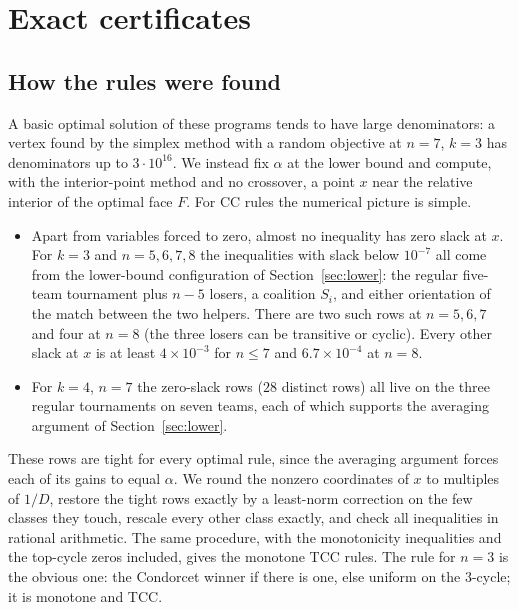 \documentclass[11pt]{amsart}
\theoremstyle{definition}
\theoremstyle{remark}
\begin{document}
\section{Exact certificates}\label{sec:cert}

\subsection*{How the rules were found}
A basic optimal solution of these programs tends to have large denominators: a vertex found by the simplex method with a random objective at $n=7$, $k=3$ has denominators up to $3\cdot10^{16}$. We instead fix $\alpha$ at the lower bound and compute, with the interior-point method and no crossover, a point $x$ near the relative interior of the optimal face $F$. For CC rules the numerical picture is simple.
\begin{itemize}
\item Apart from variables forced to zero, almost no inequality has zero slack at $x$. For $k=3$ and $n=5,6,7,8$ the inequalities with slack below $10^{-7}$ all come from the lower-bound configuration of Section~\ref{sec:lower}: the regular five-team tournament plus $n-5$ losers, a coalition $S_i$, and either orientation of the match between the two helpers. There are two such rows at $n=5,6,7$ and four at $n=8$ (the three losers can be transitive or cyclic). Every other slack at $x$ is at least $4\times10^{-3}$ for $n\le7$ and $6.7\times10^{-4}$ at $n=8$.
\item For $k=4$, $n=7$ the zero-slack rows ($28$ distinct rows) all live on the three regular tournaments on seven teams, each of which supports the averaging argument of Section~\ref{sec:lower}.
\end{itemize}
These rows are tight for every optimal rule, since the averaging argument forces each of its gains to equal $\alpha$. We round the nonzero coordinates of $x$ to multiples of $1/D$, restore the tight rows exactly by a least-norm correction on the few classes they touch, rescale every other class exactly, and check all inequalities in rational arithmetic. The same procedure, with the monotonicity inequalities and the top-cycle zeros included, gives the monotone TCC rules. The rule for $n=3$ is the obvious one: the Condorcet winner if there is one, else uniform on the $3$-cycle; it is monotone and TCC.
\end{document}
